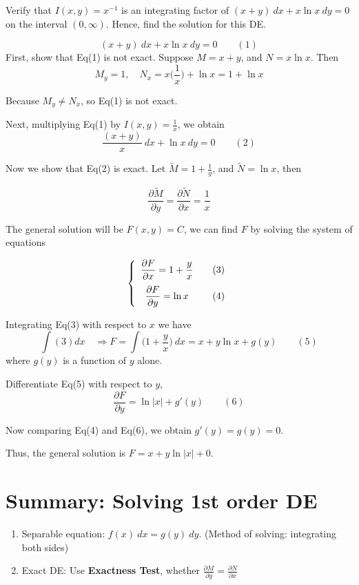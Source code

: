 \begin{example}
    Verify that $I(x,y) = x^{-1}$ is an integrating factor of 
    $(x+y)\> dx + x\ln x \> dy = 0$ on the interval $(0, \infty)$. Hence, find the 
    solution for this DE.
\end{example}
\begin{solution}
    \[
        (x+y)\> dx + x\ln x \> dy = 0 \quad \quad (1)
    \]
    First, show that Eq(1) is not exact. Suppose $M = x+y$, and $N = x\ln x$.
    Then 
    \[
        M_y = 1, \quad N_x = x\biggl(\frac{1}{x}\biggr) + \ln x = 1 + \ln x
    \]

    Because $M_y \neq N_x$, so Eq(1) is not exact.

    Next, multiplying Eq(1) by $\displaystyle I(x,y) = \frac{1}{x}$, we obtain 
    \[
        \frac{(x+y)}{x}\>dx + \ln x \> dy = 0 \quad \quad (2)
    \]

    Now we show that Eq(2) is exact. Let $\displaystyle \tilde{M} = 1 + \frac{1}{y}$, 
    and $\tilde{N} = \ln x$, then 

    \[
        \frac{\partial \tilde{M}}{\partial y} = \frac{\partial \tilde{N}}{\partial x} = \frac{1}{x}
    \]

    The general solution will be $F(x,y) = C$, we can find $F$ by solving 
    the system of equations 

    \[
        \left\{
        \begin{array}{cc}
         \displaystyle \frac{\partial F}{\partial x} = 1+\frac{y}{x} & \quad \refstepcounter{equation}(3)\\[1em]
         \displaystyle \frac{\partial F}{\partial y} = \ln x & \quad \refstepcounter{equation}(4)
        \end{array}
        \right.
    \]

    Integrating Eq(3) with respect to $x$ we have 
    \[
        \int (3) dx \quad \Rightarrow F = \int \biggl(1 + \frac{y}{x}\biggr)\> dx 
        = x + y\ln x + g(y) \quad \quad (5)
    \]
    where $g(y)$ is a function of $y$ alone.

    Differentiate Eq(5) with respect to $y$, 
    \[
        \frac{\partial F}{\partial y} = \ln |x| + g'(y) \quad \quad (6)
    \]

    Now comparing Eq(4) and Eq(6), we obtain $g'(y) = g(y) = 0$.
    
    Thus, the general solution is $F = x + y\ln |x| + 0$.

\end{solution}

\section*{Summary: Solving 1st order DE}

\begin{enumerate}
    \item Separable equation: $f(x) \>dx = g(y) \>dy$. (Method of solving: integrating both sides)
    \item Exact DE: Use \textbf{Exactness Test}, whether 
        $\displaystyle \frac{\partial M}{\partial y} = \frac{\partial N}{\partial x}$
\end{enumerate}